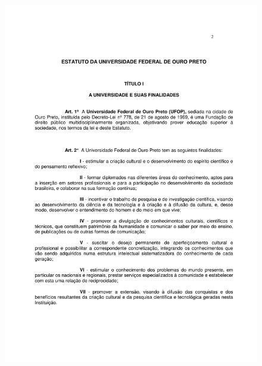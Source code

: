 \begin{figure}[p]
	\centering 
	\includegraphics[scale=0.7]{capitulos/resolucoes/cuni414/cuni414-2.pdf}
\end{figure} \pagebreak

